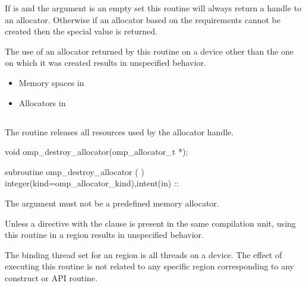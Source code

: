 If  is  and the  argument is an empty set this routine will always return a handle to an allocator. Otherwise if an allocator based on the requirements cannot be created then the special value  is returned.

The use of an allocator returned by this routine on a device other than the one on which it was created results in unspecified behavior.

\crossreferences
\begin{itemize}
\item Memory spaces in 
\item Allocators in 
\end{itemize}

\subsection{}
\label{subsec:omp_destroy_allocator}

\summary
The  routine releases all resources used by the allocator handle.

\format
\begin{ccppspecific}
\begin{ompcFunction}
void omp_destroy_allocator(omp_allocator_t *);
\end{ompcFunction}
\end{ccppspecific}
\begin{fortranspecific}
\begin{ompfSubroutine}
subroutine omp_destroy_allocator (  )
integer(kind=omp_allocator_kind),intent(in) :: 
\end{ompfSubroutine}
\end{fortranspecific}

\constraints

The  argument must not be a predefined memory allocator.

Unless a  directive with the  clause is present in the same compilation unit, using this routine in a  region results in unspecified behavior.

\binding

The binding thread set for an  region is all threads on a device.
The effect of executing this routine is not related to any specific region corresponding to any construct or API routine.

